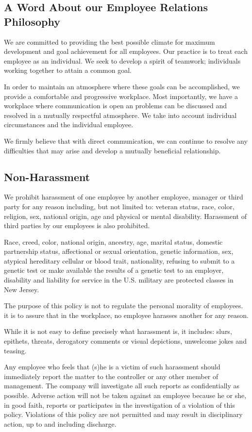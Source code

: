 \subsection{A Word About our Employee Relations Philosophy}

We are committed to providing the best possible climate for maximum development and goal achievement for all employees. Our practice is to treat each employee as an individual. We seek to develop a spirit of teamwork; individuals working together to attain a common goal.

In order to maintain an atmosphere where these goals can be accomplished, we provide a comfortable and progressive workplace. Most importantly, we have a workplace where communication is open an problems can be discussed and resolved in a mutually respectful atmosphere. We take into account individual circumstances and the individual employee.

We firmly believe that with direct communication, we can continue to resolve any difficulties that may arise and develop a mutually beneficial relationship.

\subsection{Non-Harassment}

We prohibit harassment of one employee by another employee, manager or third party for any reason including, but not limited to: veteran status, race, color, religion, sex, national origin, age and physical or mental disability. Harassment of third parties by our employees is also prohibited.

Race, creed, color, national origin, ancestry, age, marital status, domestic partnership status, affectional or sexual orientation, genetic information, sex, atypical hereditary cellular or blood trait, nationality, refusing to submit to a genetic test or make available the results of a genetic test to an employer, disability and liability for service in the U.S. military are protected classes in New Jersey.

The purpose of this policy is not to regulate the personal morality of employees. it is to assure that in the workplace, no employee harasses another for any reason.

While it is not easy to define precisely what harassment is, it includes: slurs, epithets, threats, derogatory comments or visual depictions, unwelcome jokes and teasing.

Any employee who feels that (s)he is a victim of such harassment should immediately report the matter to the controller or any other member of management. The company will investigate all such reports as confidentially as possible. Adverse action will not be taken against an employee because he or she, in good faith, reports or participates in the investigation of a violation of this policy. Violations of this policy are not permitted and may result in disciplinary action, up to and including discharge.

